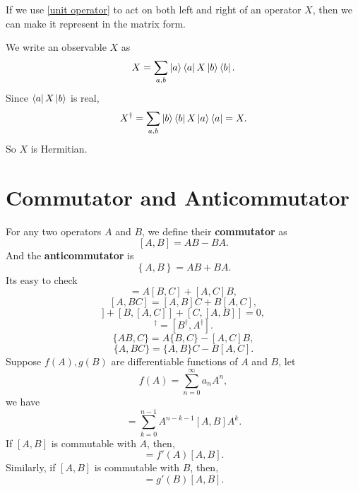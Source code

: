 \documentclass{article}
\theoremstyle{1}
\begin{document}
If we use \eqref{unit operator} to act on both left and right of an operator $X$, then we can make it represent in the matrix form.

We write an observable $X$ as
\begin{equation}
    X=\sum_{a,b}\ket{a}\bra{a}X\ket{b}\bra{b}.
\end{equation}
Since $\bra{a}X\ket{b}$ is real, 
\begin{equation}
    X^\dagger=\sum_{a,b}\ket{b}\bra{b}X\ket{a}\bra{a}=X.
\end{equation}
So $X$ is Hermitian.

\section{Commutator and Anticommutator}
For any two operators $A$ and $B$, we define their \textbf{commutator} as
\begin{equation}
    \left[A,B\right]=AB-BA.
\end{equation}
And the \textbf{anticommutator} is
\begin{equation}
    \left\{A,B\right\}=AB+BA.
\end{equation}
Its easy to check
\begin{equation}
    [AB,C]=A[B,C]+[A,C]B,
\end{equation}
\begin{equation}\label{5.4}
    [A,BC]=[A,B]C+B[A,C],
\end{equation}
\begin{equation}
    [A,[B,C]]+[B,[A,C]]+[C,[A,B]]=0,
\end{equation}
\begin{equation}
    [A,B]^\dagger=[B^\dagger,A^\dagger].
\end{equation}
\begin{equation}
    \{AB,C\}=A\{B,C\}-[A,C]B,
\end{equation}
\begin{equation}
    \{A,BC\}=\{A,B\}C-B[A,C].
\end{equation}
Suppose $f(A),g(B)$ are differentiable functions of $A$ and $B$, let
\begin{equation}
    f(A)=\sum_{n=0}^{\infty}a_n A^n,
\end{equation}
we have 
\begin{equation}
    [A^n,B]=\sum_{k=0}^{n-1}A^{n-k-1}[A,B]A^k.
\end{equation}
If $[A,B]$ is commutable with $A$, then,
\begin{equation}
    [f(A),B]=f'(A)[A,B].
\end{equation}
Similarly, if $[A,B]$ is commutable with $B$, then,
\begin{equation}
    [A,g(B)]=g'(B)[A,B].
\end{equation}
\end{document}
